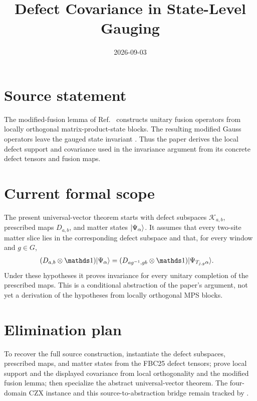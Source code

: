 \documentclass{article}
\title{Defect Covariance in State-Level Gauging}
\author{}
\date{2026-09-03}
\begin{document}
\maketitle
{}

\section{Source statement}

The modified-fusion lemma of
Ref.~\cite[lines~4215--4326]{FrancoRubio2025MPUGauging} constructs unitary
fusion operators from locally orthogonal matrix-product-state blocks. The
resulting modified Gauss operators leave the gauged state invariant
\cite[lines~4327--4335]{FrancoRubio2025MPUGauging}. Thus the paper derives the
local defect support and covariance used in the invariance argument from its
concrete defect tensors and fusion maps.

\section{Current formal scope}

The present universal-vector theorem starts with defect subspaces
$\mathcal K_{a,b}$, prescribed maps $D_{a,b}$, and matter states
$|\Psi_\alpha\rangle$. It assumes that every two-site matter slice lies in the
corresponding defect subspace and that, for every window and $g\in G$,
\begin{align}
    (D_{a,b}\otimes\Id)\ket{\Psi_\alpha}
     & =(D_{ag^{-1},gb}\otimes\Id)
    \ket{\Psi_{T_{j,g}\alpha}}.
\end{align}
Under these hypotheses it proves invariance for every unitary completion of the
prescribed maps. This is a conditional abstraction of the paper's argument,
not yet a derivation of the hypotheses from locally orthogonal MPS blocks.

\section{Elimination plan}

To recover the full source construction, instantiate the defect subspaces,
prescribed maps, and matter states from the FBC25 defect tensors; prove local
support and the displayed covariance from local orthogonality and the modified
fusion lemma; then specialize the abstract universal-vector theorem. The
four-domain CZX instance and this source-to-abstraction bridge remain tracked
by .



\end{document}
